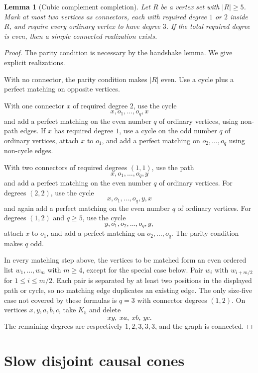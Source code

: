 \documentclass[11pt]{article}
\newtheorem{lemma}{Lemma}
\theoremstyle{remark}
\begin{document}
\begin{lemma}[Cubic complement completion]
Let $R$ be a vertex set with $|R|\ge5$.  Mark at most two vertices as connectors,
each with required degree $1$ or $2$ inside $R$, and require every ordinary vertex
to have degree $3$.  If the total required degree is even, then a simple connected
realization exists.
\end{lemma}

\begin{proof}
The parity condition is necessary by the handshake lemma.  We give explicit
realizations.

With no connector, the parity condition makes $|R|$ even.  Use a cycle plus a
perfect matching on opposite vertices.

With one connector $x$ of required degree $2$, use the cycle
\[
x,o_1,\ldots,o_q,x
\]
and add a perfect matching on the even number $q$ of ordinary vertices, using
non-path edges.  If $x$ has required degree $1$, use a cycle on the odd number
$q$ of ordinary vertices, attach $x$ to $o_1$, and add a perfect matching on
$o_2,\ldots,o_q$ using non-cycle edges.

With two connectors of required degrees $(1,1)$, use the path
\[
x,o_1,\ldots,o_q,y
\]
and add a perfect matching on the even number $q$ of ordinary vertices.
For degrees $(2,2)$, use the cycle
\[
x,o_1,\ldots,o_q,y,x
\]
and again add a perfect matching on the even number $q$ of ordinary vertices.
For degrees $(1,2)$ and $q\ge5$, use the cycle
\[
y,o_1,o_2,\ldots,o_q,y,
\]
attach $x$ to $o_1$, and add a perfect matching on
$o_2,\ldots,o_q$.  The parity condition makes $q$ odd.

In every matching step above, the vertices to be matched form an even ordered list
$w_1,\ldots,w_m$ with $m\ge4$, except for the special case below.  Pair
$w_i$ with $w_{i+m/2}$ for $1\le i\le m/2$.  Each pair is separated by at
least two positions in the displayed path or cycle, so no matching edge duplicates
an existing edge.  The only size-five case not covered by these formulas is
$q=3$ with connector degrees $(1,2)$.  On vertices $x,y,a,b,c$, take $K_5$ and
delete
\[
xy,\ xa,\ xb,\ yc.
\]
The remaining degrees are respectively $1,2,3,3,3$, and the graph is connected.
\end{proof}

\section{Slow disjoint causal cones}
\end{document}
